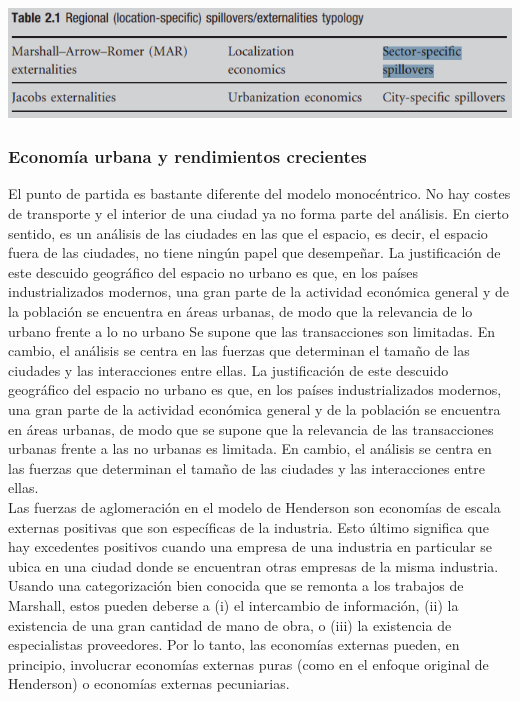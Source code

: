 \begin{center}
    \includegraphics[scale=0.5]{imagen/imagen1.png}
\end{center}

\subsubsection{Economía urbana y rendimientos crecientes}
El punto de partida es bastante diferente del modelo monocéntrico. No hay costes de transporte y el interior de una ciudad ya no forma parte del análisis. En cierto sentido, es un análisis de las ciudades en las que el espacio, es decir, el espacio fuera de las ciudades, no tiene ningún papel que desempeñar. La justificación de este descuido geográfico del espacio no urbano es que, en los países industrializados modernos, una gran parte de la actividad económica general y de la población se encuentra en áreas urbanas, de modo que la relevancia de lo urbano frente a lo no urbano Se supone que las transacciones son limitadas. En cambio, el análisis se centra en las fuerzas que determinan el tamaño de las ciudades y las interacciones entre ellas. La justificación de este descuido geográfico del espacio no urbano es que, en los países industrializados modernos, una gran parte de la actividad económica general y de la población se encuentra en áreas urbanas, de modo que se supone que la relevancia de las transacciones urbanas frente a las no urbanas es limitada. En cambio, el análisis se centra en las fuerzas que determinan el tamaño de las ciudades y las interacciones entre ellas.\\
Las fuerzas de aglomeración en el modelo de Henderson son economías de escala externas positivas que son específicas de la industria. Esto último significa que hay excedentes positivos cuando una empresa de una industria en particular se ubica en una ciudad donde se encuentran otras empresas de la misma industria. \\
Usando una categorización bien conocida que se remonta a los trabajos de Marshall, estos pueden deberse a (i) el intercambio de información, (ii) la existencia de una gran cantidad de mano de obra, o (iii) la existencia de especialistas proveedores. Por lo tanto, las economías externas pueden, en principio, involucrar economías externas puras (como en el enfoque original de Henderson) o economías externas pecuniarias.

